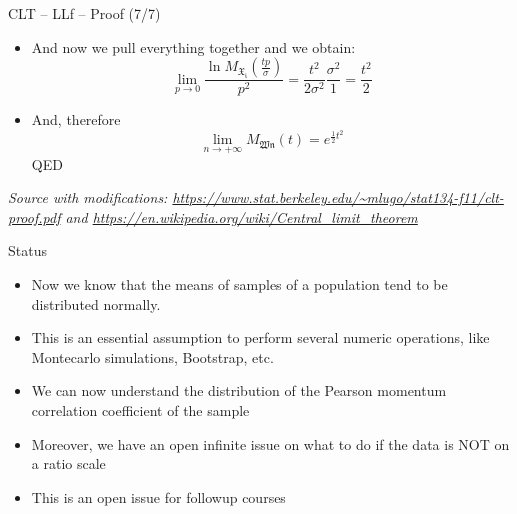 \documentclass{beamer}
\begin{document}
\begin{frame}
{\centerline{CLT -- LLf -- Proof (7/7)}}

\begin{itemize}
\item And now we pull everything together and we obtain:
$$\lim_{p \to 0} \frac{\ln M_\mathfrak{X_i}(\frac{tp}{\sigma})}{p^2} = \frac{t^2}{2\sigma^2} \frac{\sigma^2}{1} = \frac{t^2}{2} $$
\item And, therefore
$$\lim_{n \to + \infty} M_\mathfrak{Wn}(t) = e ^{\frac{1}{2}t^2}$$
QED
\end{itemize}

\textit{\tiny
\vspace{-\baselineskip}
Source with modifications: \url{https://www.stat.berkeley.edu/~mlugo/stat134-f11/clt-proof.pdf} and \url{https://en.wikipedia.org/wiki/Central_limit_theorem}}
\end{frame}


\begin{frame}
{\centerline{Status}}

\begin{itemize}
\item Now we know that the means of samples of a population tend to be distributed normally.
\item This is an essential assumption to perform several numeric operations, like Montecarlo simulations, Bootstrap, etc.
\item We can now understand the distribution of the Pearson momentum correlation coefficient of the sample
\item Moreover, we have an open infinite issue on what to do if the data is NOT on a ratio scale
\item This is an open issue for followup courses
\end{itemize}


\end{frame}
\end{document}
